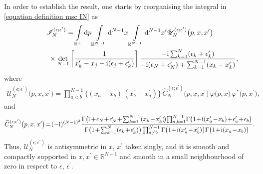 In order to establish the result, one starts by reorganising the integral in \eqref{equation definition msc IN} as
\begin{gather*}
\mathscr{I}_N^{(\epsilon;\epsilon^{\prime})} = \int\limits_{\mathbb{R}^+}{} {\rm d}p \int\limits_{\mathbb{R}^{N-1}}{}
{\rm d}^{N-1}x \int\limits_{\mathbb{R}^{N-1}}{} {\rm d}^{N-1}x^{\prime}
\mathscr{U}_N^{(\epsilon;\epsilon^{\prime})}\big(p,x,x^{\prime} \big)
 \\ \hphantom{\mathscr{I}_N^{(\epsilon;\epsilon^{\prime})} =}
\times \det_{N-1}\bigg[ \frac{1}{x^{\prime}_k-x_j-{\rm i} (\epsilon_j+\epsilon_k^{\prime}) } \bigg] \,
\frac{-{\rm i} \sum_{k=1}^{N}(\epsilon_k+\epsilon_k^{\prime}) }{-{\rm i}(\epsilon_N+\epsilon_N^{\prime}) + \sum_{k=1}^{N-1}(x_k - x_k^{\prime}) },
\end{gather*}
where
\begin{gather*}
\mathscr{U}_N^{(\epsilon;\epsilon^{\prime})}\big(p,x,x^{\prime} \big) =
 \prod\limits_{a<b}^{N-1} \big\{ (x_{a}-x_{b})\, (x_{b}^{\prime}-x_{a}^{\prime}) \big\} \,
\widehat{C}_N^{(\epsilon;\epsilon^{\prime})}\big(p,x,x^{\prime} \big) \, \varphi\big(p,x\big) \, \varphi^{*}\big(p,x^{\prime}\big) ,
\end{gather*}
and
\begin{gather*}
\widehat{C}_N^{(\epsilon;\epsilon^{\prime})}\big(p,x,x^{\prime} \big) \! =\! (-{\rm i})^{(N-1)^2}
\frac{ \Gamma\big(\! 1\!+\! \epsilon_N\!+\!\epsilon^{\prime}_N\! +\!\sum_{k=1}^{N-1}(x_k \!-\! x_k^{\prime})\! \big) \!\prod_{ a,b=1 }^{ N-1 }\!
 \Gamma\big(1\!+\!{\rm i}(x_a^{\prime}\!-\!x_b)\!+\!\epsilon'_a\!+\!\epsilon_b \big) }{
 \Gamma\big( 1\!+\! \sum_{k=1}^{N}(\epsilon_k\! +\! \epsilon_k^{\prime}) \big) \prod_{ a \not= b }^{ N-1 }
 \Gamma\big(1\!+\!{\rm i} (x_{a}^{\prime}\!-\!x_{b}^{\prime})\big) \Gamma\big( 1\!+\!{\rm i} (x_{a}\!-\!x_{b}) \big) }.
\end{gather*}
Thus, $\mathscr{U}_N^{(\epsilon;\epsilon^{\prime})}$ is antisymmetric in $x$, $x^{\prime}$ taken singly, and it is smooth and compactly
supported in $x, x^{\prime} \in \mathbb{R}^{N-1}$ and smooth in a small neighbourhood of zero in respect to $\epsilon$, $\epsilon^{\prime}$.

